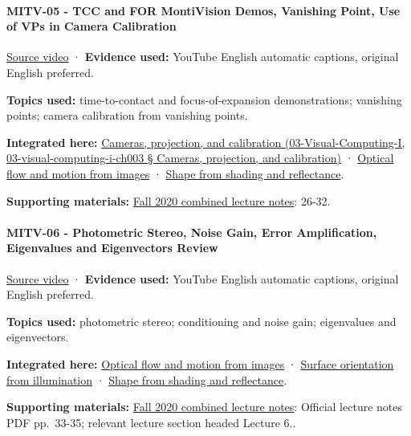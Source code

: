 \paragraph{MITV-05 - TCC and FOR MontiVision Demos, Vanishing Point, Use of VPs in Camera Calibration}\label{mitv-05---tcc-and-for-montivision-demos-vanishing-point-use-of-vps-in-camera-calibration}

\href{https://www.youtube.com/watch?v=SSlPV1iYjHw}{Source video} · \textbf{Evidence used:} YouTube English automatic captions, original English preferred.

\textbf{Topics used:} time-to-contact and focus-of-expansion demonstrations; vanishing points; camera calibration from vanishing points.

\textbf{Integrated here:} \href{}{Cameras, projection, and calibration (03-Visual-Computing-I, 03-visual-computing-i-ch003 § Cameras, projection, and calibration)} · \hyperref[04-visual-computing-ii-ch030]{Optical flow and motion from images} · \hyperref[04-visual-computing-ii-ch032]{Shape from shading and reflectance}.

\textbf{Supporting materials:} \href{https://ocw.mit.edu/courses/6-801-machine-vision-fall-2020/9ec44f69e72995c370b3797818ba01e6_MIT6_801F20_lectureNotes.pdf}{Fall 2020 combined lecture notes}: 26-32.

\paragraph{MITV-06 - Photometric Stereo, Noise Gain, Error Amplification, Eigenvalues and Eigenvectors Review}\label{mitv-06---photometric-stereo-noise-gain-error-amplification-eigenvalues-and-eigenvectors-review}

\href{https://www.youtube.com/watch?v=OOrT17RsVxE}{Source video} · \textbf{Evidence used:} YouTube English automatic captions, original English preferred.

\textbf{Topics used:} photometric stereo; conditioning and noise gain; eigenvalues and eigenvectors.

\textbf{Integrated here:} \hyperref[04-visual-computing-ii-ch030]{Optical flow and motion from images} · \hyperref[04-visual-computing-ii-ch032]{Surface orientation from illumination} · \hyperref[04-visual-computing-ii-ch032]{Shape from shading and reflectance}.

\textbf{Supporting materials:} \href{https://ocw.mit.edu/courses/6-801-machine-vision-fall-2020/9ec44f69e72995c370b3797818ba01e6_MIT6_801F20_lectureNotes.pdf}{Fall 2020 combined lecture notes}: Official lecture notes PDF pp.~33-35; relevant lecture section headed Lecture 6..

